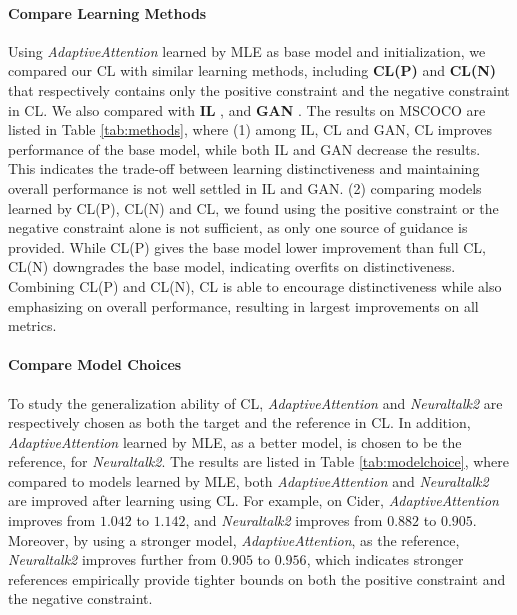 \paragraph{Compare Learning Methods}
Using \emph{AdaptiveAttention} learned by MLE as base model and initialization, 
we compared our CL with similar learning methods,
including \textbf{CL(P)} and \textbf{CL(N)} that respectively contains only the positive constraint and the negative constraint in CL.
We also compared with
\textbf{IL} \cite{vedantam2017context}, and \textbf{GAN} \cite{dai2017towards}.
The results on MSCOCO are listed in Table \ref{tab:methods},
where (1) among IL, CL and GAN, CL improves performance of the base model,
while both IL and GAN decrease the results. 
This indicates the trade-off between learning distinctiveness and maintaining overall performance 
is not well settled in IL and GAN.
(2) comparing models learned by CL(P), CL(N) and CL,
we found using the positive constraint or the negative constraint alone is not sufficient,
as only one source of guidance is provided.
While CL(P) gives the base model lower improvement than full CL, 
CL(N) downgrades the base model, 
indicating overfits on distinctiveness.
Combining CL(P) and CL(N), 
CL is able to encourage distinctiveness while also emphasizing on overall performance,
resulting in largest improvements on all metrics.




\vspace{-5pt}
\paragraph{Compare Model Choices} To study the generalization ability of CL,
\emph{AdaptiveAttention} and \emph{Neuraltalk2} are respectively chosen 
as both the target and the reference in CL.
In addition, \emph{AdaptiveAttention} learned by MLE,
as a better model, is chosen to be the reference,
for \emph{Neuraltalk2}.
The results are listed in Table \ref{tab:modelchoice},
where compared to models learned by MLE,
both \emph{AdaptiveAttention} and \emph{Neuraltalk2} are improved after learning using CL.
For example, on Cider, \emph{AdaptiveAttention} improves from $1.042$ to $1.142$,
and \emph{Neuraltalk2} improves from $0.882$ to $0.905$.
Moreover, by using a stronger model, \emph{AdaptiveAttention}, as the reference,
\emph{Neuraltalk2} improves further from $0.905$ to $0.956$,
which indicates stronger references empirically provide tighter bounds on both the positive constraint and the negative constraint.

